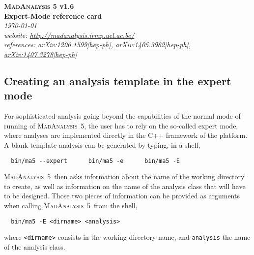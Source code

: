 \documentclass[a4paper]{article}
\newcommand{\MA}{\textsc{MadAnalysis}~5}
\begin{document}
\begin{center} 
{\color{ao} \huge \textbf{\textsc{MadAnalysis} 5 v1.6}} \\ \vspace{0.25cm}
{\color{ao} \huge \textbf{Expert-Mode reference card}} \\ \vspace{0.25cm}
\vspace{0.1cm} \textsl{\today}\\
\vspace{0.1cm} \textsl{website: \url{http://madanalysis.irmp.ucl.ac.be/}}\\
\vspace{0.1cm} \textsl{references: \href{https://arxiv.org/abs/1206.1599}{arXiv:1206.1599[hep-ph]}, \href{https://arxiv.org/abs/1405.3982}{arXiv:1405.3982[hep-ph]}, \href{https://arxiv.org/abs/1407.3278}{arXiv:1407.3278[hep-ph]}}
\end{center}

\hspace{0.5cm}

\begin{shaded}
\section{\Large Creating an analysis template in the expert mode}
\end{shaded}

For sophisticated analysis going beyond the capabilities of the normal mode of
running of \MA, the user has to rely on the so-called expert mode, where
analyses are implemented directly in the C++ framework of the platform. A blank
template analysis can be generated by typing, in a shell,
{\color{ao}\begin{verbatim}
  bin/ma5 --expert      bin/ma5 -e      bin/ma5 -E
\end{verbatim}}
\MA\ then asks information about the name of the working directory to create, as
well as information on the name of the analysis class that will have to be
designed. Those two pieces of information can be provided as arguments when
calling \MA\ from the shell,
{\color{ao}\begin{verbatim}
  bin/ma5 -E <dirname> <analysis>
\end{verbatim}}
where \verb+<dirname>+ consists in the working directory name, and
\verb+analysis+ the name of the analysis class.
\end{document}
